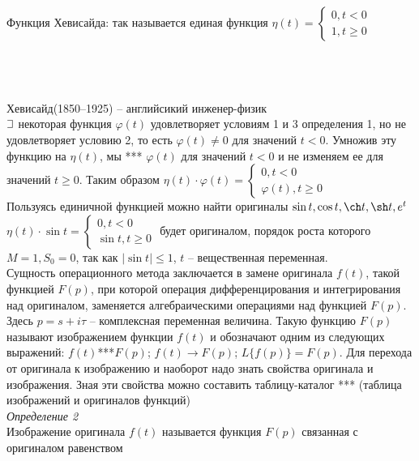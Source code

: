 \documentclass{article}
\numberwithin{equation}{section}
\def\letus{%
    \mathord{\setbox0=\hbox{$\exists$}%
             \hbox{\kern 0.125\wd0%
                   \vbox to \ht0{%
                      \hrule width 0.75\wd0%
                      \vfill%
                      \hrule width 0.75\wd0}%
                   \vrule height \ht0%
                   \kern 0.125\wd0}%
           }%
}
\begin{document}
Функция Хевисайда: так называется единая функция $\eta(t)=\begin{cases}
0,t<0\\
1,t\geqslant0
\end{cases}$\\\\
\\\\
Хевисайд(1850--1925) -- английсикий инженер-физик\\
$\letus$ некоторая функция $\varphi(t)$ удовлетворяет условиям 1 и 3 определения 1, но не удовлетворяет условию 2, то есть $\varphi(t)\neq0$ для значений $t<0$. Умножив эту функцию на $\eta(t)$, мы \colorbox{red!50}{***} $\varphi(t)$ для значений $t<0$ и не изменяем ее для значений $t\geqslant0$. Таким образом $\eta(t)\cdot\varphi(t)=\begin{cases}
0,t<0\\
\varphi(t),t\geqslant0
\end{cases}$\\
Пользуясь единичной функцией можно найти оригиналы $\sin t,\cos t,\ch t,\sh t,e^t$\\
$\eta(t)\cdot\sin t=\begin{cases}
0,t<0\\
\sin t,t\geqslant0
\end{cases}$ будет оригиналом, порядок роста которого $M=1,S_0=0$, так как $|\sin t|\leqslant1$, $t$ -- вещественная переменная.\\
Сущность операционного метода заключается в замене оригинала $f(t)$, такой функцией $F(p)$, при которой операция дифференцирования и интегрирования над оригиналом, заменяется алгебраическими операциями над функцией $F(p)$. Здесь $p=s+i\tau$ -- комплексная переменная величина. Такую функцию $F(p)$ называют изображением функции $f(t)$ и обозначают одним из следующих выражений: $f(t)$\colorbox{red!50}{***}$F(p)$; $f(t)\rightarrow F(p)$; $L\{f(p)\}=F(p)$. Для перехода от оригинала к изображению и наоборот надо знать свойства оригинала и изображения. Зная эти свойства можно составить таблицу-каталог \colorbox{red!50}{***} (таблица изображений и оригиналов функций)\\
\textit{Определение 2}\\
Изображение оригинала $f(t)$ называется функция $F(p)$ связанная с оригиналом равенством 
\end{document}
